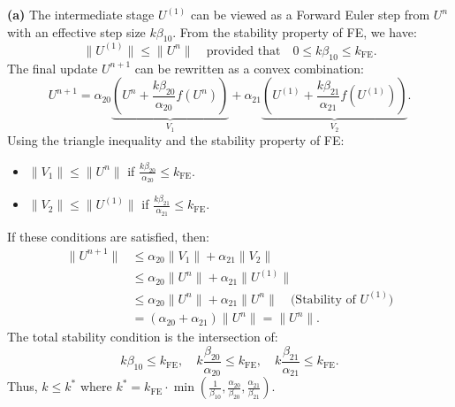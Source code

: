 \begin{solution}
\textbf{(a)} The intermediate stage $U^{(1)}$ can be viewed as a Forward Euler step from $U^n$ with an effective step size $k\beta_{10}$. From the stability property of FE, we have:
\[ \|U^{(1)}\| \leq \|U^n\| \quad \text{provided that} \quad 0 \leq k\beta_{10} \leq k_{\mathrm{FE}}. \]
The final update $U^{n+1}$ can be rewritten as a convex combination:
\[ U^{n+1} = \alpha_{20} \underbrace{\left( U^n + \frac{k\beta_{20}}{\alpha_{20}} f(U^n) \right)}_{V_1} + \alpha_{21} \underbrace{\left( U^{(1)} + \frac{k\beta_{21}}{\alpha_{21}} f(U^{(1)}) \right)}_{V_2}. \]
Using the triangle inequality and the stability property of FE:
\begin{itemize}
    \item $\|V_1\| \leq \|U^n\|$ if $\frac{k\beta_{20}}{\alpha_{20}} \leq k_{\mathrm{FE}}$.
    \item $\|V_2\| \leq \|U^{(1)}\|$ if $\frac{k\beta_{21}}{\alpha_{21}} \leq k_{\mathrm{FE}}$.
\end{itemize}
If these conditions are satisfied, then:
\begin{align*}
\|U^{n+1}\| &\leq \alpha_{20} \|V_1\| + \alpha_{21} \|V_2\| \\
&\leq \alpha_{20} \|U^n\| + \alpha_{21} \|U^{(1)}\| \\
&\leq \alpha_{20} \|U^n\| + \alpha_{21} \|U^n\| \quad \text{(Stability of } U^{(1)}) \\
&= (\alpha_{20} + \alpha_{21}) \|U^n\| = \|U^n\|.
\end{align*}
The total stability condition is the intersection of:
\[ k\beta_{10} \leq k_{\mathrm{FE}}, \quad k\frac{\beta_{20}}{\alpha_{20}} \leq k_{\mathrm{FE}}, \quad k\frac{\beta_{21}}{\alpha_{21}} \leq k_{\mathrm{FE}}. \]
Thus, $k \leq k^*$ where $k^* = k_{\mathrm{FE}} \cdot \min \left( \frac{1}{\beta_{10}}, \frac{\alpha_{20}}{\beta_{20}}, \frac{\alpha_{21}}{\beta_{21}} \right)$.


\end{solution}
